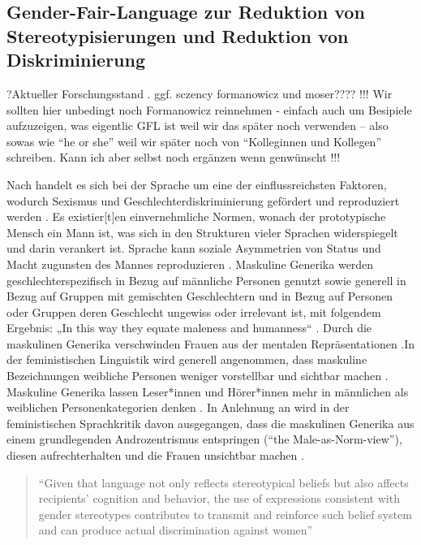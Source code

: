 \documentclass[12pt, 
    twoside=false, 
    bibliography=totoc, 
    numbers=endperiod, 
    headings=normal, 
    toc=chapterentrydotfill
    ]{scrbook}
\begin{document}
\subsection{Gender-Fair-Language zur Reduktion von Stereotypisierungen und Reduktion von Diskriminierung}

?Aktueller Forschungsstand . ggf. sczency formanowicz und moser???? !!! Wir sollten hier unbedingt noch Formanowicz reinnehmen - einfach auch um Besipiele aufzuzeigen, was eigentlic GFL ist weil wir das später noch verwenden -- also sowas wie \enquote{he or she} weil wir später noch von \enquote{Kolleginnen und Kollegen} schreiben. Kann ich aber selbst noch ergänzen wenn genwünscht !!!

Nach \textcite{menegatti_2017} handelt es sich bei der Sprache um eine der einflussreichsten Faktoren, wodurch Sexismus und Geschlechterdiskriminierung gefördert und reproduziert werden \parencite*[1]{menegatti_2017}. Es existier[t]en einvernehmliche Normen, wonach der prototypische Mensch ein Mann ist, was sich in den Strukturen vieler Sprachen widerspiegelt und darin verankert ist. Sprache kann soziale Asymmetrien von Status und Macht zugunsten des Mannes reproduzieren \parencite{menegatti_2017}.
Maskuline Generika werden geschlechterspezifisch in Bezug auf männliche Personen genutzt sowie generell in Bezug auf Gruppen mit gemischten Geschlechtern und in Bezug auf Personen oder Gruppen deren Geschlecht ungewiss oder irrelevant ist, mit folgendem Ergebnis: „In this way they equate maleness and humanness“ \parencite[169]{stahlberg_2007}. Durch die maskulinen Generika verschwinden Frauen aus der mentalen Repräsentationen \parencites{vaughan_2018}{stahlberg_2001}.In der feministischen Linguistik wird generell angenommen, dass maskuline Bezeichnungen weibliche Personen weniger vorstellbar und sichtbar machen \parencite[131]{stahlberg_2001}. Maskuline Generika lassen Leser*innen und Hörer*innen mehr in männlichen als weiblichen Personenkategorien denken \parencites[2]{sczesny_2016}{stahlberg_2007}. In Anlehnung an \textcite{stahlberg_2007} wird in der feministischen Sprachkritik davon ausgegangen, dass die maskulinen Generika aus einem grundlegenden Androzentrismus entspringen (\enquote{the Male-as-Norm-view}), diesen aufrechterhalten und die Frauen unsichtbar machen \parencites[170]{stahlberg_2007}{miller_1976}{silveira_1980}.

\begin{quote}
    \enquote{Given that language not only reflects stereotypical beliefs but also affects recipients’ cognition and behavior, the use of expressions consistent with gender stereotypes contributes to transmit and reinforce such belief system and can produce actual discrimination against women} \parencite[2]{menegatti_2017}
\end{quote}
\end{document}
